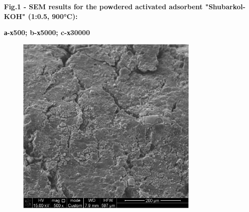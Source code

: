 
{\bfseries Fig.1 - SEM results for the powdered activated adsorbent
"Shubarkol-KOH" (1:0.5, 900°C):}

{\bfseries а-х500; b-х5000; c-х30000}

\begin{figure}[H]
	\centering
	\includegraphics[width=0.8\textwidth]{media/chem2/image12}
	\caption*{}
\end{figure}

